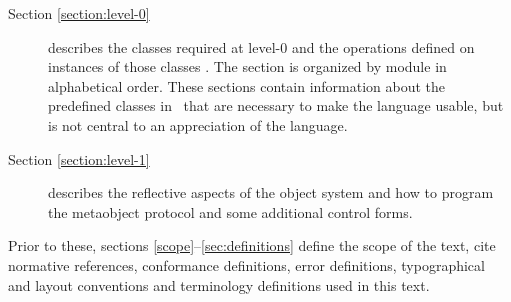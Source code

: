 \begin{optDefinition}
\begin{description}
    \item[Section \ref{section:level-0}] describes the classes required at
    level-0 and the operations defined on instances of those classes
    .  The section is organized by module in
    alphabetical order.  These sections contain information about the predefined
    classes in \eulisp\ that are necessary to make the language usable, but is
    not central to an appreciation of the language.
    \item[Section \ref{section:level-1}] describes the reflective aspects of the
    object system and how to program the metaobject protocol and some additional
    control forms.
\end{description}
%
Prior to these, sections \ref{scope}--\ref{sec:definitions} define the scope of
the text, cite normative references, conformance definitions, error definitions,
typographical and layout conventions and terminology definitions used in this
text.
\end{optDefinition}
%
\label{scope}
